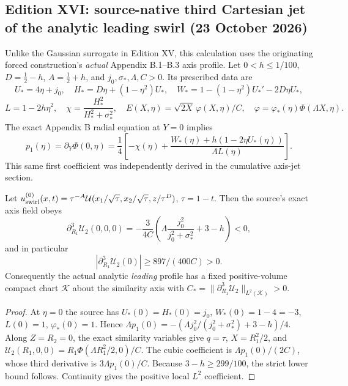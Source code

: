 \subsection*{Edition XVI: source-native third Cartesian jet of the analytic leading swirl (23 October 2026)}
\label{subsec:editionXVI-source-axis-jet}
Unlike the Gaussian surrogate in Edition XV, this calculation uses the originating forced construction's \emph{actual} Appendix B.1--B.3 axis profile. Let $0<h\le1/100$, $D=\frac12-h$, $A=\frac12+h$, and $j_0,\sigma_*,\Lambda,C>0$. Its prescribed data are
\[
U_*=4\eta+j_0,\quad H_*=D\eta+(1-\eta^2)U_*,
\quad W_*=1-(1-\eta^2)U_*'-2D\eta U_*,
\]
\[
L=1-2h\eta^2,\quad\chi=\frac{H_*^2}{H_*^2+\sigma_*^2},
\quad E(X,\eta)=\sqrt{2X}\,\varphi(X,\eta)/C,\quad
\varphi=\varphi_*(\eta)\Phi(\Lambda X,\eta).
\]
The exact Appendix B radial equation at $Y=0$ implies
\[
p_1(\eta)=\partial_Y\Phi(0,\eta)
=\frac14\left[-\chi(\eta)+
\frac{W_*(\eta)+h(1-2\eta U_*(\eta))}{\Lambda L(\eta)}\right].
\]
This same first coefficient was independently derived in the cumulative axis-jet section.

\begin{theorem}
Let $u_{\rm swirl}^{(0)}(x,t)=\tau^{-A}\mathcal U(x_1/\sqrt\tau,x_2/\sqrt\tau,z/\tau^D)$, $\tau=1-t$. Then the source's exact axis field obeys
\begin{equation}\label{eq:XVI-source-axis-jet}
\boxed{\partial_{R_1}^3\mathcal U_2(0,0,0)=
-\frac3{4C}\left(\Lambda\frac{j_0^2}{j_0^2+\sigma_*^2}+3-h\right)<0,}
\end{equation}
and in particular
\[
\boxed{|\partial_{R_1}^3\mathcal U_2(0)|\ge897/(400C)>0.}
\]
Consequently the actual analytic \emph{leading} profile has a fixed positive-volume compact chart $\mathcal K$ about the similarity axis with $C_*=\|\partial_{R_1}^3\mathcal U_2\|_{L^2(\mathcal K)}>0$.
\end{theorem}
\begin{proof}
At $\eta=0$ the source has $U_*(0)=H_*(0)=j_0$, $W_*(0)=1-4=-3$, $L(0)=1$, $\varphi_*(0)=1$. Hence $\Lambda p_1(0)=-(\Lambda j_0^2/(j_0^2+\sigma_*^2)+3-h)/4$. Along $Z=R_2=0$, the exact similarity variables give $q=\tau$, $X=R_1^2/2$, and
$\mathcal U_2(R_1,0,0)=R_1\Phi(\Lambda R_1^2/2,0)/C$.
The cubic coefficient is $\Lambda p_1(0)/(2C)$, whose third derivative is $3\Lambda p_1(0)/C$. Because $3-h\ge299/100$, the strict lower bound follows. Continuity gives the positive local $L^2$ coefficient.
\end{proof}

